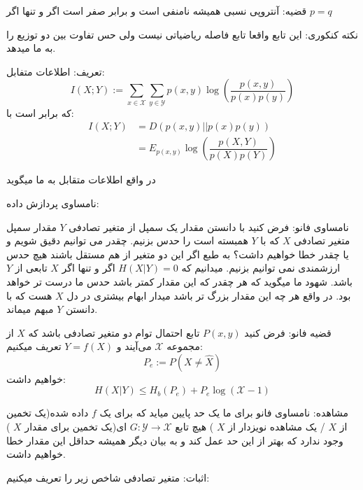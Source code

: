 قضیه: آنتروپی نسبی همیشه نامنفی است و برابر صفر است اگر و تنها اگر
$p = q$

نکته کنکوری: این تابع واقعا تابع فاصله ریاضیاتی نیست ولی حس تفاوت بین دو توزیع را به ما میدهد.

تعریف: اطلاعات متفابل:
$$I(X; Y) := \sum_{x \in \mathcal{X}} \sum_{y \in \mathcal{Y}} p(x, y) \log(\dfrac{p(x, y)}{p(x)p(y)})$$
که برابر است با:
\begin{align*}
    I(X;Y) &= D(p(x, y) || p(x)p(y))
    \\
    &= E_{p(x, y)} \log(\dfrac{p(X, Y)}{p(X)p(Y)})
\end{align*}

در واقع اطلاعات متقابل به ما میگوید

نامساوی پردازش داده:


نامساوی فانو: فرض کنید با دانستن مقدار یک سمپل از متغیر تصادفی
$Y$
مقدار سمپل متغیر تصادفی
$X$
که با
$Y$
همبسته است را حدس بزنیم. چقدر می توانیم دقیق شویم و یا چقدر خطا خواهیم داشت؟ به طبع اگر این دو متغیر از هم مستقل باشند هیچ حدس ارزشمندی نمی توانیم بزنیم. میدانیم که
$H(X|Y) = 0$
اگر و تنها اگر
$X$
تابعی از
$Y$
باشد. شهود ما میگوید که هر چقدر که این مقدار کمتر باشد حدس ما درست تر خواهد بود. در واقع هر چه این مقدار بزرگ تر باشد میدار ابهام بیشتری در دل
$X$
هست که با دانستن
$Y$
مبهم میماند.

قضیه فانو: فرض کنید
$P(x, y)$
تابع احتمال توام دو متغیر تصادفی باشد که
$X$
از مجموعه
$\mathcal{X}$
می‌آیند و
$Y = f(X)$
تعریف میکنیم:
$$P_e := P(X \neq \hat{X})$$
خواهیم داشت:
$$H(X|Y) \leq H_b(P_e) + P_e \log(\mathcal{X} - 1)$$


مشاهده: نامساوی فانو برای ما یک حد پایین میاید که برای یک
$f$
داده شده(یک تخمین از
$X$
/ یک مشاهده نویزدار از
$X$
) هیچ تابع
$G:\mathcal{Y} \rightarrow \mathcal{X}$
ای(یک تخمین برای مقدار
$X$
) وجود ندارد که بهتر از این حد عمل کند و به بیان دیگر همیشه حداقل این مقدار خطا خواهیم داشت.

اثبات:
متغیر تصادفی شاخص زیر را تعریف میکنیم:

